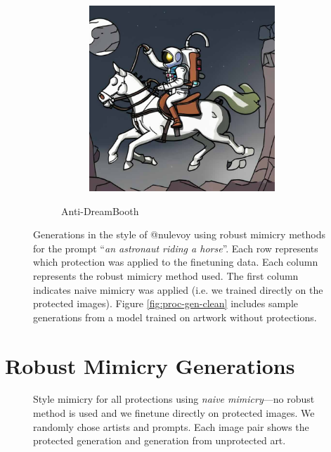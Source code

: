 \documentclass{article}
\begin{document}
\begin{figure}[h]
\begin{subfigure}[t]{\textwidth}
\begin{subfigure}[b]{0.19\textwidth}
         \includegraphics[width=\textwidth]{plots/process/generations/antidb/upscale.jpeg}
     \end{subfigure}
    \caption{Anti-DreamBooth}
    \end{subfigure}
    \caption{Generations in the style of @nulevoy using robust mimicry methods for the prompt ``\textit{an astronaut riding a horse}''. Each row represents which protection was applied to the finetuning data. Each column represents the robust mimicry method used. The first column indicates naive mimicry was applied (i.e. we trained directly on the protected images). Figure \ref{fig:proc-gen-clean} includes sample generations from a model trained on artwork without protections.}
    \label{fig:proc-gen-robust}
\end{figure}

\newpage
\section{Robust Mimicry Generations}
\label{ap:generations}

\begin{figure}[h]
    \centering
    \hspace*{-3.4cm}
    \caption{Style mimicry for all protections using \emph{naive mimicry}---no robust method is used and we finetune directly on protected images. We randomly chose artists and prompts. Each image pair shows the protected generation and generation from unprotected art.} 
    \label{fig:nodefensesamples}
\end{figure}
\end{document}
